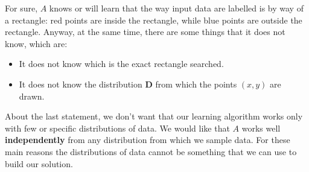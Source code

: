 For sure, $A$ knows or will learn that the way input data are labelled is by way of a rectangle: red points are inside the rectangle, while blue points 
are outside the rectangle. Anyway, at the same time, there are some things that it does not know, which are:
\begin{itemize}
    \renewcommand{\labelitemi}{-}
    \item It does not know which is the exact rectangle searched.
    \item It does not know the distribution $\boldsymbol{D}$ from which the points $(x,y)$ are drawn.
\end{itemize}
About the last statement, we don't want that our learning algorithm works only with few or specific distributions of data. We would like that $A$ works
well \textbf{independently} from any distribution from which we sample data. For these main reasons the distributions of data cannot be something that we can use 
to build our solution.